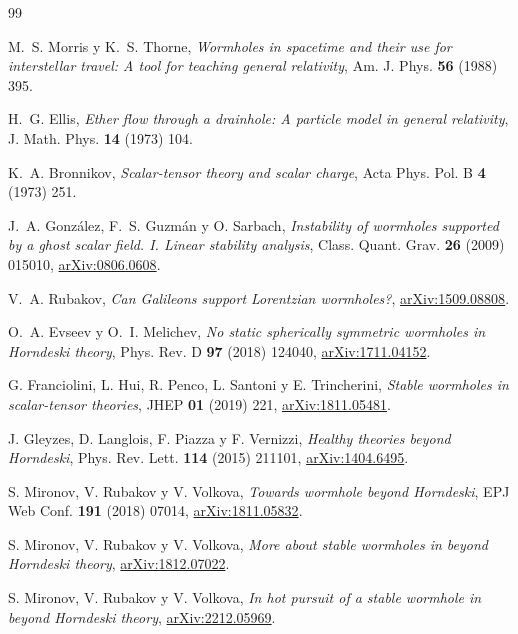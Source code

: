 \documentclass[11pt,a4paper]{article}
\theoremstyle{remark}
\begin{document}
\begin{thebibliography}{99}

 M.~S. Morris y K.~S. Thorne, \emph{Wormholes in spacetime and their use for interstellar travel: A tool for teaching general relativity}, Am. J. Phys. \textbf{56} (1988) 395.

 H.~G. Ellis, \emph{Ether flow through a drainhole: A particle model in general relativity}, J. Math. Phys. \textbf{14} (1973) 104.

 K.~A. Bronnikov, \emph{Scalar-tensor theory and scalar charge}, Acta Phys. Pol. B \textbf{4} (1973) 251.

 J.~A. González, F.~S. Guzmán y O. Sarbach, \emph{Instability of wormholes supported by a ghost scalar field. I. Linear stability analysis}, Class. Quant. Grav. \textbf{26} (2009) 015010, \href{https://arxiv.org/abs/0806.0608}{arXiv:0806.0608}.

 V.~A. Rubakov, \emph{Can Galileons support Lorentzian wormholes?}, \href{https://arxiv.org/abs/1509.08808}{arXiv:1509.08808}.

 O.~A. Evseev y O.~I. Melichev, \emph{No static spherically symmetric wormholes in Horndeski theory}, Phys. Rev. D \textbf{97} (2018) 124040, \href{https://arxiv.org/abs/1711.04152}{arXiv:1711.04152}.

 G. Franciolini, L. Hui, R. Penco, L. Santoni y E. Trincherini, \emph{Stable wormholes in scalar-tensor theories}, JHEP \textbf{01} (2019) 221, \href{https://arxiv.org/abs/1811.05481}{arXiv:1811.05481}.

 J. Gleyzes, D. Langlois, F. Piazza y F. Vernizzi, \emph{Healthy theories beyond Horndeski}, Phys. Rev. Lett. \textbf{114} (2015) 211101, \href{https://arxiv.org/abs/1404.6495}{arXiv:1404.6495}.

 S. Mironov, V. Rubakov y V. Volkova, \emph{Towards wormhole beyond Horndeski}, EPJ Web Conf. \textbf{191} (2018) 07014, \href{https://arxiv.org/abs/1811.05832}{arXiv:1811.05832}.

 S. Mironov, V. Rubakov y V. Volkova, \emph{More about stable wormholes in beyond Horndeski theory}, \href{https://arxiv.org/abs/1812.07022}{arXiv:1812.07022}.

 S. Mironov, V. Rubakov y V. Volkova, \emph{In hot pursuit of a stable wormhole in beyond Horndeski theory}, \href{https://arxiv.org/abs/2212.05969}{arXiv:2212.05969}.


\end{thebibliography}
\end{document}
